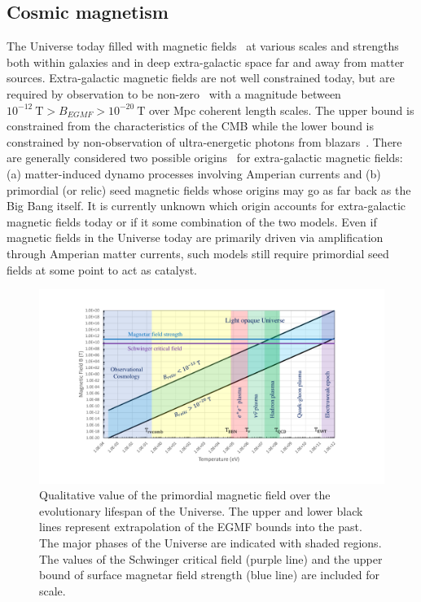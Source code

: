 \documentclass[universe,article,submit,moreauthors,pdftex,a4paper]{Definitions/mdpi}
\begin{document}
\subsection{Cosmic magnetism}\label{sec:energy}
\noindent The Universe today filled with magnetic fields~\cite{Kronberg:1993vk} at various scales and strengths both within galaxies and in deep extra-galactic space far and away from matter sources. Extra-galactic magnetic fields are not well constrained today, but are required by observation to be non-zero~\cite{Anchordoqui:2001bs,Widrow:2002ud} with a magnitude between $10^{-12}\ \mathrm{T}>B_{EGMF}>10^{-20}\ \mathrm{T}$ over Mpc coherent length scales. The upper bound is constrained from the characteristics of the CMB while the lower bound is constrained by non-observation of ultra-energetic photons from blazars~\cite{Neronov:2010gir}. There are generally considered two possible origins~\cite{Widrow:2011hs,Vazza:2021vwy} for extra-galactic magnetic fields: (a) matter-induced dynamo processes involving Amperian currents and (b) primordial (or relic) seed magnetic fields whose origins may go as far back as the Big Bang itself. It is currently unknown which origin accounts for extra-galactic magnetic fields today or if it some combination of the two models. Even if magnetic fields in the Universe today are primarily driven via amplification through Amperian matter currents, such models still require primordial seed fields at some point to act as catalyst.

\begin{figure}[htbp]
 \centering \includegraphics[trim=110 50 120 40,clip,width=\textwidth]{./plots/relic_plot.pdf}
 \caption{Qualitative value of the primordial magnetic field over the evolutionary lifespan of the Universe. The upper and lower black lines represent extrapolation of the EGMF bounds into the past. The major phases of the Universe are indicated with shaded regions. The values of the Schwinger critical field (purple line) and the upper bound of surface magnetar field strength (blue line) are included for scale.\label{relic_plot}}
\end{figure}
\end{document}
